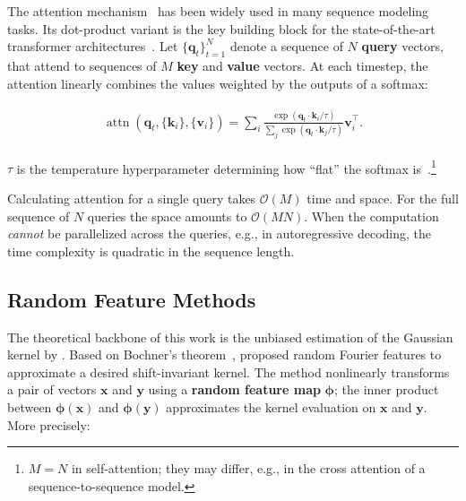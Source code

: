 The attention mechanism~\citep{bahdanau2015attention} has been widely used in many sequence modeling tasks. Its dot-product variant is the key building block for the state-of-the-art transformer architectures~\citep{vaswani2017attention}. Let $\{{\mathbf{q}}_t\}_{t=1}^{N}$ denote a sequence of $N$ \textbf{query} vectors, that attend to sequences of $M$ \textbf{key} and \textbf{value} vectors. At each timestep, the attention linearly combines the values weighted by the outputs of a softmax:

\begin{align}\label{eq:attention}
\begin{split}
    \operatorname{attn}\left({\mathbf{q}}_t,\{{\mathbf{k}}_i\},\{{\mathbf{v}}_i\}\right)=\sum_i
    \frac{\exp\left({\mathbf{q}}_t\cdot{\mathbf{k}}_i /\tau\right)}
    {\sum_j\exp\left({\mathbf{q}}_t\cdot{\mathbf{k}}_j /\tau\right)}{\mathbf{v}}_i^\top.
\end{split}
\end{align}

$\tau$ is the temperature hyperparameter determining how ``flat'' the softmax is~\citep{hinton2015distilling}.\footnote{
 $M=N$ in self-attention; they may differ, e.g., in the cross attention of a sequence-to-sequence model. }

Calculating attention for a single query takes ${\mathcal{O}}(M)$ time and space. For the full sequence of $N$ queries the space amounts to ${\mathcal{O}}(MN)$.
When the computation \emph{cannot} be parallelized across the queries, e.g., in autoregressive decoding, the time complexity is quadratic in the sequence length.

\subsection{Random Feature Methods}\label{sec:random_feature}
The theoretical backbone of this work is the unbiased estimation of the Gaussian kernel by \citet{rahimi2009rff}.
Based on Bochner's theorem~\citep{bochner1955harmonic},
\citet{rahimi2009rff} proposed random Fourier features to approximate  a desired shift-invariant kernel. The method nonlinearly transforms a pair of vectors ${\mathbf{x}}$ and ${\mathbf{y}}$ using a \textbf{random feature map} $\boldsymbol{\phi}$;
the inner product between $\boldsymbol{\phi}({\mathbf{x}})$ and $\boldsymbol{\phi}({\mathbf{y}})$
approximates the kernel evaluation on ${\mathbf{x}}$ and ${\mathbf{y}}$.
More precisely:

